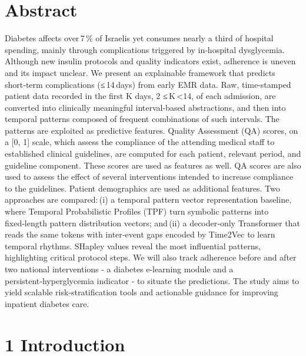 \documentclass[
]{article}
\begin{document}
\section{}\label{section}

\section{Abstract}\label{abstract}

Diabetes affects over\,7\,\% of Israelis yet consumes nearly a third of
hospital spending, mainly through complications triggered by in‑hospital
dysglycemia. Although new insulin protocols and quality indicators
exist, adherence is uneven and its impact unclear. We present an
explainable framework that predicts short‑term complications
(≤\,14\,days) from early EMR data. Raw, time-stamped patient data
recorded in the first K days, 2 ≤\,K\,\textless14, of each admission,
are converted into clinically meaningful interval-based abstractions,
and then into temporal patterns composed of frequent combinations of
such intervals. The patterns are exploited as predictive features.
Quality Assessment (QA) scores, on a {[}0, 1{]} scale, which assess the
compliance of the attending medical staff to established clinical
guidelines, are computed for each patient, relevant period, and
guideline component. These scores are used as features as well. QA
scores are also used to assess the effect of several interventions
intended to increase compliance to the guidelines. Patient demographics
are used as additional features. Two approaches are compared:\,(i) a
temporal pattern vector representation baseline, where Temporal
Probabilistic Profiles (TPF) turn symbolic patterns into fixed‑length
pattern distribution vectors; and\,(ii) a decoder‑only Transformer that
reads the same tokens with inter‑event gaps encoded by Time2Vec to learn
temporal rhythms. SHapley values reveal the most influential patterns,
highlighting critical protocol steps. We will also track adherence
before and after two national interventions - a diabetes e‑learning
module and a persistent‑hyperglycemia indicator - to situate the
predictions. The study aims to yield scalable risk‑stratification tools
and actionable guidance for improving inpatient diabetes care.

\section{1 Introduction}\label{introduction}
\end{document}
